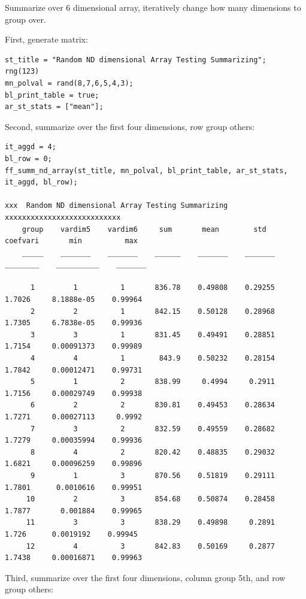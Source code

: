 \documentclass[
]{book}
\begin{document}
Summarize over 6 dimensional array, iteratively change how many
dimensions to group over.

First, generate matrix:

\begin{verbatim}
st_title = "Random ND dimensional Array Testing Summarizing";
rng(123)
mn_polval = rand(8,7,6,5,4,3);
bl_print_table = true;
ar_st_stats = ["mean"];
\end{verbatim}

Second, summarize over the first four dimensions, row group others:

\begin{verbatim}
it_aggd = 4; 
bl_row = 0; 
ff_summ_nd_array(st_title, mn_polval, bl_print_table, ar_st_stats, it_aggd, bl_row);

xxx  Random ND dimensional Array Testing Summarizing  xxxxxxxxxxxxxxxxxxxxxxxxxxx
    group    vardim5    vardim6     sum       mean        std      coefvari       min          max  
    _____    _______    _______    ______    _______    _______    ________    __________    _______

      1         1          1       836.78    0.49808    0.29255     1.7026     8.1888e-05    0.99964
      2         2          1       842.15    0.50128    0.28968     1.7305     6.7838e-05    0.99936
      3         3          1       831.45    0.49491    0.28851     1.7154     0.00091373    0.99989
      4         4          1        843.9    0.50232    0.28154     1.7842     0.00012471    0.99731
      5         1          2       838.99     0.4994     0.2911     1.7156     0.00029749    0.99938
      6         2          2       830.81    0.49453    0.28634     1.7271     0.00027113     0.9992
      7         3          2       832.59    0.49559    0.28682     1.7279     0.00035994    0.99936
      8         4          2       820.42    0.48835    0.29032     1.6821     0.00096259    0.99896
      9         1          3       870.56    0.51819    0.29111     1.7801      0.0010616    0.99951
     10         2          3       854.68    0.50874    0.28458     1.7877       0.001884    0.99965
     11         3          3       838.29    0.49898     0.2891      1.726      0.0019192    0.99945
     12         4          3       842.83    0.50169     0.2877     1.7438     0.00016871    0.99963
\end{verbatim}

Third, summarize over the first four dimensions, column group 5th, and
row group others:
\end{document}
